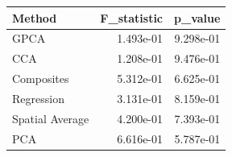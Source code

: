 \begin{tabular}{lrr}
\toprule
Method & F_statistic & p_value \\
\midrule
GPCA & 1.493e-01 & 9.298e-01 \\
CCA & 1.208e-01 & 9.476e-01 \\
Composites & 5.312e-01 & 6.625e-01 \\
Regression & 3.131e-01 & 8.159e-01 \\
Spatial Average & 4.200e-01 & 7.393e-01 \\
PCA & 6.616e-01 & 5.787e-01 \\
\bottomrule
\end{tabular}
